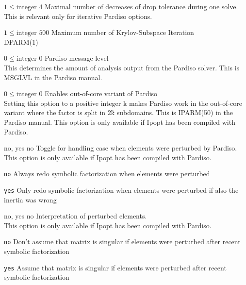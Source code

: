 %
{$1\leq\textrm{integer}$}%
{$4$}%
{Maximal number of decreases of drop tolerance during one solve.\\
This is relevant only for iterative Pardiso options.}%
{}

%
{$1\leq\textrm{integer}$}%
{$500$}%
{Maximum number of Krylov-Subspace Iteration\\
DPARM(1)}%
{}

%
{$0\leq\textrm{integer}$}%
{$0$}%
{Pardiso message level\\
This determines the amount of analysis output from the Pardiso solver. This is MSGLVL in the Pardiso manual.}%
{}

%
{$0\leq\textrm{integer}$}%
{$0$}%
{Enables out-of-core variant of Pardiso\\
Setting this option to a positive integer k makes Pardiso work in the out-of-core variant where the factor is split in 2\^k subdomains.  This is IPARM(50) in the Pardiso manual.  This option is only available if Ipopt has been compiled with Pardiso.}%
{}

%
{\ttfamily no, yes}%
{no}%
{Toggle for handling case when elements were perturbed by Pardiso.\\
This option is only available if Ipopt has been compiled with Pardiso.}%
{\begin{list}{}{
\setlength{\parsep}{0em}
\setlength{\leftmargin}{5ex}
\setlength{\labelwidth}{2ex}
\setlength{\itemindent}{0ex}
\setlength{\topsep}{0pt}}
\item[\texttt{no}] Always redo symbolic factorization when elements were perturbed
\item[\texttt{yes}] Only redo symbolic factorization when elements were perturbed if also the inertia was wrong
\end{list}
}

%
{\ttfamily no, yes}%
{no}%
{Interpretation of perturbed elements.\\
This option is only available if Ipopt has been compiled with Pardiso.}%
{\begin{list}{}{
\setlength{\parsep}{0em}
\setlength{\leftmargin}{5ex}
\setlength{\labelwidth}{2ex}
\setlength{\itemindent}{0ex}
\setlength{\topsep}{0pt}}
\item[\texttt{no}] Don't assume that matrix is singular if elements were perturbed after recent symbolic factorization
\item[\texttt{yes}] Assume that matrix is singular if elements were perturbed after recent symbolic factorization
\end{list}
}

